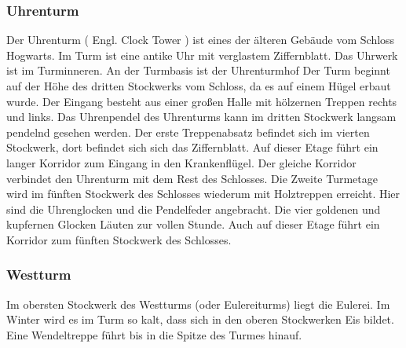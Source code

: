 \documentclass[a4paper, 10pt]{article}
\begin{document}
\subsubsection*{\large Uhrenturm}
Der Uhrenturm (  Engl.  Clock Tower ) ist eines der älteren Gebäude vom Schloss Hogwarts. Im Turm ist eine antike Uhr mit verglastem Ziffernblatt. Das Uhrwerk ist im Turminneren. An der Turmbasis ist der Uhrenturmhof
\vspace{10pt}
\newline
{}  
Der Turm beginnt auf der Höhe des dritten Stockwerks vom Schloss, da es auf einem Hügel erbaut wurde. Der Eingang besteht aus einer großen Halle mit hölzernen Treppen rechts und links. Das Uhrenpendel des Uhrenturms kann im dritten Stockwerk langsam pendelnd gesehen werden. Der erste Treppenabsatz befindet sich im vierten Stockwerk, dort befindet sich sich das Ziffernblatt. Auf dieser Etage führt ein langer Korridor zum Eingang in den Krankenflügel. Der gleiche Korridor verbindet den Uhrenturm mit dem Rest des Schlosses.
\vspace{10pt}
\newline
{}  
Die Zweite Turmetage wird im fünften Stockwerk des Schlosses wiederum mit Holztreppen erreicht. Hier sind die Uhrenglocken und die Pendelfeder angebracht. Die vier goldenen und kupfernen Glocken Läuten zur vollen Stunde. Auch auf dieser Etage führt ein Korridor zum fünften Stockwerk des Schlosses.
\subsubsection*{\large Westturm}
Im obersten Stockwerk des Westturms (oder Eulereiturms) liegt die Eulerei. Im Winter wird es im Turm so kalt, dass sich in den oberen Stockwerken Eis bildet. Eine Wendeltreppe führt bis in die Spitze des Turmes hinauf.
\end{document}
